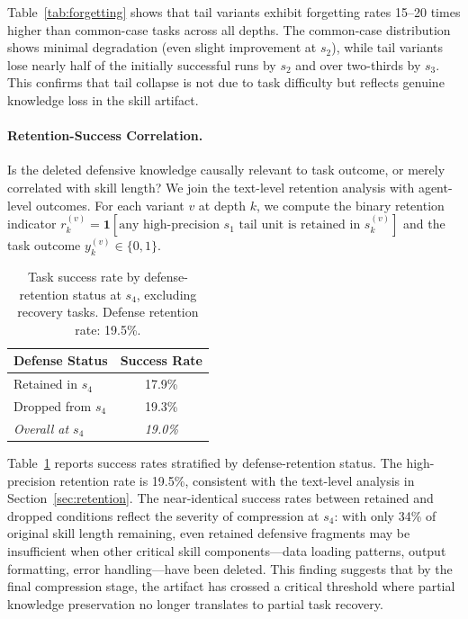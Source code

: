 \documentclass[11pt]{article}
\begin{document}
Table~\ref{tab:forgetting} shows that tail variants exhibit forgetting rates 15--20 times higher than common-case tasks across all depths. The common-case distribution shows minimal degradation (even slight improvement at $s_2$), while tail variants lose nearly half of the initially successful runs by $s_2$ and over two-thirds by $s_3$. This confirms that tail collapse is not due to task difficulty but reflects genuine knowledge loss in the skill artifact.

\paragraph{Retention-Success Correlation.}
\label{sec:correlation}
Is the deleted defensive knowledge causally relevant to task outcome, or merely correlated with skill length? We join the text-level retention analysis with agent-level outcomes. For each variant $v$ at depth $k$, we compute the binary retention indicator $r_k^{(v)} = \mathbf{1}[\text{any high-precision } s_1 \text{ tail unit is retained in } s_k^{(v)}]$ and the task outcome $y_k^{(v)} \in \{0,1\}$.

\begin{table}[t]
\centering\small
\begin{tabular}{@{}lc@{}}
\toprule
\textbf{Defense Status} & \textbf{Success Rate} \\
\midrule
Retained in $s_4$ & 17.9\% \\
Dropped from $s_4$ & 19.3\% \\
\midrule
\textit{Overall at $s_4$} & \textit{19.0\%} \\
\bottomrule
\end{tabular}
\caption{Task success rate by defense-retention status at $s_4$, excluding recovery tasks. Defense retention rate: 19.5\%.}
\label{tab:correlation}
\end{table}

Table~\ref{tab:correlation} reports success rates stratified by defense-retention status. The high-precision retention rate is 19.5\%, consistent with the text-level analysis in Section~\ref{sec:retention}. The near-identical success rates between retained and dropped conditions reflect the severity of compression at $s_4$: with only 34\% of original skill length remaining, even retained defensive fragments may be insufficient when other critical skill components---data loading patterns, output formatting, error handling---have been deleted. This finding suggests that by the final compression stage, the artifact has crossed a critical threshold where partial knowledge preservation no longer translates to partial task recovery.
\end{document}

